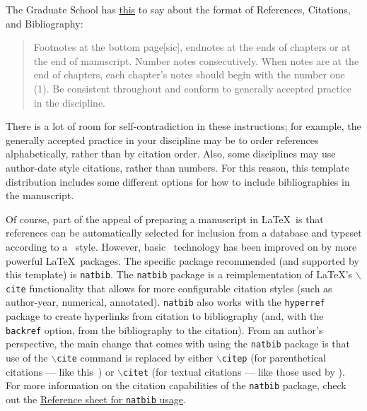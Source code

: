 The Graduate School has \href{http://gsnb.rutgers.edu/guide.php3}{this} to say about the format of References, Citations, and Bibliography:
\begin{quote}
Footnotes at the bottom page[sic], endnotes at the ends of chapters or at the end of manuscript.
Number notes consecutively.
When notes are at the end of chapters, each chapter's notes should begin with the number one (1).
Be consistent throughout and conform to generally accepted practice in the discipline.
\end{quote}
There is a lot of room for self-contradiction in these instructions; for example, the generally accepted practice in your discipline may be to order references alphabetically, rather than by citation order.
Also, some disciplines may use author-date style citations, rather than numbers.
For this reason, this template distribution includes some different options for how to include bibliographies in the manuscript.

Of course, part of the appeal of preparing a manuscript in \LaTeX\ is that references can be automatically selected for inclusion from a database and typeset according to a \BibTeX\ style.
However, basic \BibTeX\ technology has been improved on by more powerful \LaTeX\ packages.
The specific package recommended (and supported by this template) is \texttt{natbib}.
The \texttt{natbib} package is a reimplementation of \LaTeX's $\backslash$\texttt{cite} functionality that allows for more configurable citation styles (such as author-year, numerical, annotated).
\texttt{natbib} also works with the \texttt{hyperref} package to create hyperlinks from citation to bibliography (and, with the \texttt{backref} option, from the bibliography to the citation).
From an author's perspective, the main change that comes with using the \texttt{natbib} package is that use of the $\backslash$\texttt{cite} command is replaced by either $\backslash$\texttt{citep} (for parenthetical citations --- like this~\citep{Edmunds:2005:ICDE}) or $\backslash$\texttt{citet} (for textual citations --- like those used by \citet{Kaufman:2005:SIGGRAPH}).
For more information on the citation capabilities of the \texttt{natbib} package, check out the \href{http://merkel.zoneo.net/Latex/natbib.php}{Reference sheet for \texttt{natbib} usage}.

